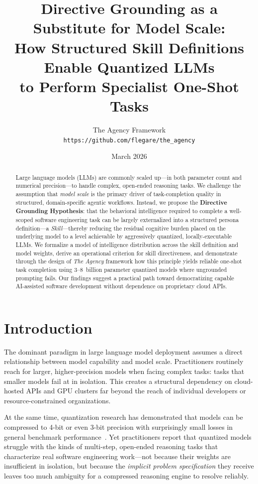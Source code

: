 \documentclass[11pt,a4paper]{article}
\title{%
  \textbf{Directive Grounding as a Substitute for Model Scale:}\\
  \large How Structured Skill Definitions Enable Quantized LLMs\\
  to Perform Specialist One-Shot Tasks
}
\author{
  The Agency Framework\\
  \texttt{https://github.com/flegare/the\_agency}
}
\date{March 2026}
\begin{document}
\maketitle

\begin{abstract}
Large language models (LLMs) are commonly scaled up—in both parameter count
and numerical precision—to handle complex, open-ended reasoning tasks. We
challenge the assumption that \emph{model scale} is the primary driver of
task-completion quality in structured, domain-specific agentic workflows.
Instead, we propose the \textbf{Directive Grounding Hypothesis}: that the
behavioral intelligence required to complete a well-scoped software
engineering task can be largely externalized into a structured persona
definition—a \emph{Skill}—thereby reducing the residual cognitive burden
placed on the underlying model to a level achievable by aggressively
quantized, locally-executable LLMs. We formalize a model of intelligence
distribution across the skill definition and model weights, derive an
operational criterion for skill directiveness, and demonstrate through the
design of \textit{The Agency} framework how this principle yields reliable
one-shot task completion using 3--8~billion parameter quantized models where
ungrounded prompting fails. Our findings suggest a practical path toward
democratizing capable AI-assisted software development without dependence on
proprietary cloud APIs.
\end{abstract}

\tableofcontents
\newpage

\section{Introduction}

The dominant paradigm in large language model deployment assumes a direct
relationship between model capability and model scale. Practitioners
routinely reach for larger, higher-precision models when facing complex tasks:
tasks that smaller models fail at in isolation. This creates a structural
dependency on cloud-hosted APIs and GPU clusters far beyond the reach of
individual developers or resource-constrained organizations.

At the same time, quantization research has demonstrated that models can be
compressed to 4-bit or even 3-bit precision with surprisingly small losses in
general benchmark performance~\citep{frantar2022gptq, dettmers2022llmint8}.
Yet practitioners report that quantized models struggle with the kinds of
multi-step, open-ended reasoning tasks that characterize real software
engineering work—not because their weights are insufficient in isolation, but
because the \emph{implicit problem specification} they receive leaves too much
ambiguity for a compressed reasoning engine to resolve reliably.
\end{document}
